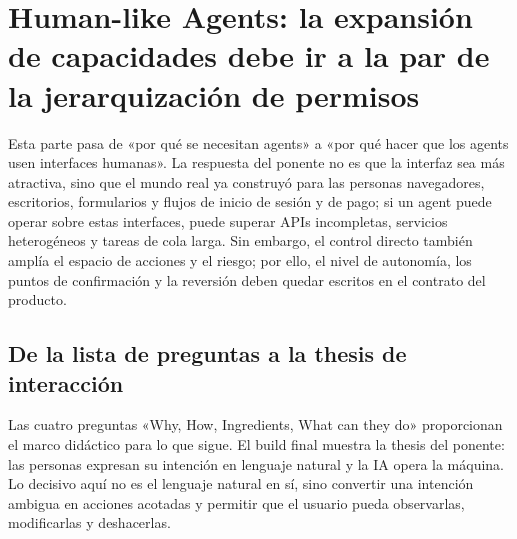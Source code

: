 \section{Human-like Agents: la expansión de capacidades debe ir a la par de la jerarquización de permisos}

Esta parte pasa de «por qué se necesitan agents» a «por qué hacer que los agents usen interfaces humanas». La respuesta del ponente no es que la interfaz sea más atractiva, sino que el mundo real ya construyó para las personas navegadores, escritorios, formularios y flujos de inicio de sesión y de pago; si un agent puede operar sobre estas interfaces, puede superar APIs incompletas, servicios heterogéneos y tareas de cola larga. Sin embargo, el control directo también amplía el espacio de acciones y el riesgo; por ello, el nivel de autonomía, los puntos de confirmación y la reversión deben quedar escritos en el contrato del producto.



\subsection{De la lista de preguntas a la thesis de interacción}

Las cuatro preguntas «Why, How, Ingredients, What can they do» proporcionan el marco didáctico para lo que sigue. El build final muestra la thesis del ponente: las personas expresan su intención en lenguaje natural y la IA opera la máquina. Lo decisivo aquí no es el lenguaje natural en sí, sino convertir una intención ambigua en acciones acotadas y permitir que el usuario pueda observarlas, modificarlas y deshacerlas.




